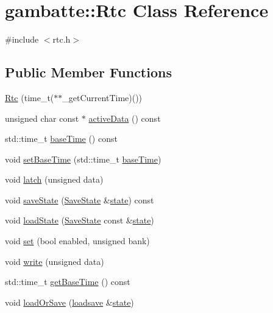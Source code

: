 \hypertarget{classgambatte_1_1Rtc}{}\section{gambatte\+:\+:Rtc Class Reference}
\label{classgambatte_1_1Rtc}


{\ttfamily \#include $<$rtc.\+h$>$}

\subsection*{Public Member Functions}
\begin{DoxyCompactItemize}
\item 
\hyperlink{classgambatte_1_1Rtc_a973c37737e42cc8240ab6e72c5e54ad7}{Rtc} (time\+\_\+t($\ast$$\ast$\+\_\+get\+Current\+Time)())
\item 
unsigned char const  $\ast$ \hyperlink{classgambatte_1_1Rtc_af8583ee3e0f695e1767684e2aabb3230}{active\+Data} () const
\item 
std\+::time\+\_\+t \hyperlink{classgambatte_1_1Rtc_a3426823fab7fa783811c74defd0d9f69}{base\+Time} () const
\item 
void \hyperlink{classgambatte_1_1Rtc_a8f6a66da2950e4acf0b2864cd06d3e46}{set\+Base\+Time} (std\+::time\+\_\+t \hyperlink{classgambatte_1_1Rtc_a3426823fab7fa783811c74defd0d9f69}{base\+Time})
\item 
void \hyperlink{classgambatte_1_1Rtc_a0986e93dac2d0591c2360c06adcf6ae7}{latch} (unsigned data)
\item 
void \hyperlink{classgambatte_1_1Rtc_a15dc530ecbc4a08b87cccbbef7edf236}{save\+State} (\hyperlink{structgambatte_1_1SaveState}{Save\+State} \&\hyperlink{ppu_8cpp_a2f2eca6997ee7baf8901725ae074d45b}{state}) const
\item 
void \hyperlink{classgambatte_1_1Rtc_a00b679656de31227d310103c2fbc6dda}{load\+State} (\hyperlink{structgambatte_1_1SaveState}{Save\+State} const \&\hyperlink{ppu_8cpp_a2f2eca6997ee7baf8901725ae074d45b}{state})
\item 
void \hyperlink{classgambatte_1_1Rtc_ae920c8c9653060f77518ebc8ef9b2369}{set} (bool enabled, unsigned bank)
\item 
void \hyperlink{classgambatte_1_1Rtc_a556546e7742058b49770da5c8012a62f}{write} (unsigned data)
\item 
std\+::time\+\_\+t \hyperlink{classgambatte_1_1Rtc_ac205e0c579b109da6d618267aebc60bf}{get\+Base\+Time} () const
\item 
void \hyperlink{classgambatte_1_1Rtc_ac38be521ff567763689059ce538bd320}{load\+Or\+Save} (\hyperlink{classgambatte_1_1loadsave}{loadsave} \&\hyperlink{ppu_8cpp_a2f2eca6997ee7baf8901725ae074d45b}{state})
\end{DoxyCompactItemize}
